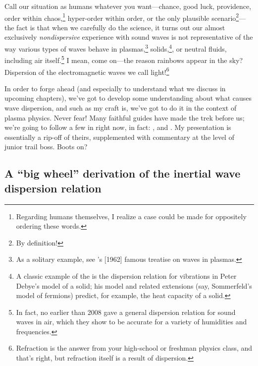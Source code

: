 Call our situation as humans whatever you want---chance, good luck, providence,
order within chaos,\footnote{Regarding humans themselves, I realize a case could
  be made for oppositely ordering these words.}  hyper-order within order, or
the only plausible scenario\footnote{By definition!}---the fact is that when we
carefully do the science, it turns out our almost exclusively
\emph{nondispersive} experience with sound waves is not representative of the
way various types of waves behave in plasmas,\footnote{As a solitary example,
  see \citeauthor{Stix1962}'s [1962] famous treatise on waves in plasmas.}
solids,\footnote{A classic example of the is the dispersion relation for
  vibrations in Peter Debye's model of a solid; his model and related extensions
  (say, Sommerfeld's model of fermions) predict, for example, the heat capacity
  of a solid.}, or neutral fluids, including air itself.\footnote{In fact, no
  earlier than 2008 \citeauthor{Alvarez2008} gave a general dispersion relation
  for sound waves in air, which they show to be accurate for a variety of
  humidities and frequencies.}  I mean, come on---the reason rainbows appear in
the sky?  Dispersion of the electromagnetic waves we call
light!\footnote{Refraction is the answer from your high-school or freshman
  physics class, and that's right, but refraction itself is a result of
  dispersion.}

In order to forge ahead (and especially to understand what we discuss in
upcoming chapters), we've got to develop some understanding about what causes
wave dispersion, and such as my craft is, we've got to do it in the context of
plasma physics. Never fear! Many faithful guides have made the trek before us;
we're going to follow a few in right now, in fact: \citet{Goertz1979}, and
\citet{Kletzing1994}. My presentation is essentially a rip-off of theirs,
supplemented with commentary at the level of junior trail boss. Boots on?

\subsection[A ``big wheel'' derivation of the IAW dispersion
relation]{A ``big wheel'' derivation of the inertial \Alf wave dispersion
  relation}


